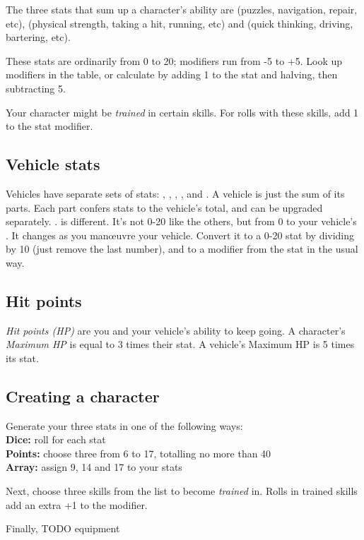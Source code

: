 \documentclass[10pt, a4paper, twocolumn]{article}
\begin{document}
The three stats that sum up a character's ability are  (puzzles,
navigation, repair,  etc),  (physical strength, taking a hit,
running, etc) and  (quick thinking, driving, bartering, etc).

These stats are ordinarily from 0 to 20; modifiers run from -5 to +5. Look up
modifiers in the table, or calculate by adding 1 to the stat and halving, then
subtracting 5.

Your character might be \emph{trained} in certain skills. For rolls with these
skills, add 1 to the stat modifier.

\subsection{Vehicle stats}
Vehicles have separate sets of stats: , ,
, ,  and . A vehicle
is just the sum of its parts. Each part confers stats to the vehicle's total,
and can be upgraded separately.
.
 is different. It's not 0-20 like the others, but from 0 to your
vehicle's . It changes as you man\oe{}uvre your vehicle.
Convert it to a 0-20 stat by dividing by 10 (just remove the last number), and
to a modifier from the stat in the usual way.

\subsection{Hit points}
\emph{Hit points (HP)} are you and your vehicle's ability to keep going. A
character's \emph{Maximum HP} is equal to 3 times their  stat. A
vehicle's Maximum HP is 5 times its  stat.

\subsection{Creating a character}
Generate your three stats in one of the following ways:\\
\textbf{Dice:} roll  for each stat\\
\textbf{Points:} choose three from 6 to 17, totalling no more than 40\\
\textbf{Array:} assign 9, 14 and 17 to your stats

Next, choose three skills from the list to become \emph{trained} in. Rolls in
trained skills add an extra +1 to the modifier.

Finally, TODO equipment
\end{document}
